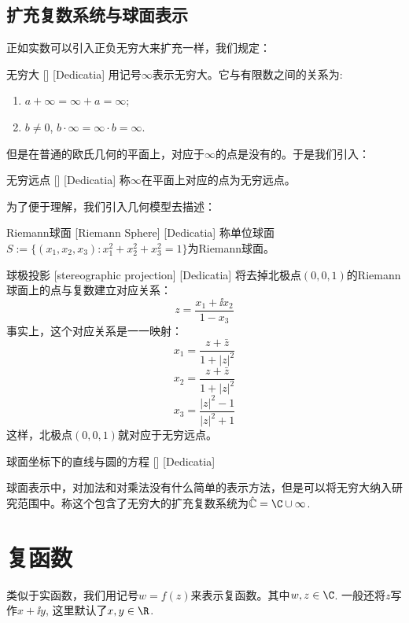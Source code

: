 \documentclass[UTF8]{ctexart}
\begin{document}
\subsection{扩充复数系统与球面表示}
正如实数可以引入正负无穷大来扩充一样，我们规定：
\begin{dfn}
    [UUID]
    {无穷大}
    []
    [Dedicatia]
    用记号$\infty$表示无穷大。它与有限数之间的关系为:
    \begin{enumerate}
        \item $a+\infty=\infty+a=\infty$;
        \item $b\neq 0$, $b\cdot\infty=\infty\cdot b=\infty$.
    \end{enumerate}
\end{dfn}
但是在普通的欧氏几何的平面上，对应于$\infty$的点是没有的。于是我们引入：
\begin{dfn}
    [UUID]
    {无穷远点}
    []
    [Dedicatia]
    称$\infty$在平面上对应的点为无穷远点。
\end{dfn}
为了便于理解，我们引入几何模型去描述：
\begin{dfn}
    [UUID]
    {Riemann球面}
    [Riemann Sphere]
    [Dedicatia]
    称单位球面$S:=\{(x_1,x_2,x_3):x_1^2+x_2^2+x_3^2=1\}$为Riemann球面。
\end{dfn}
\begin{ppt}
    [UUID]
    {球极投影}
    [stereographic projection]
    [Dedicatia]
    将去掉北极点$(0,0,1)$的Riemann球面上的点与复数建立对应关系：
    \[z=\frac{x_1+\ii x_2}{1-x_3}\]
    事实上，这个对应关系是一一映射：
    \[x_1=\frac{z+\bar{z}}{1+|z|^2}\]
    \[x_2=\frac{z+\bar{z}}{1+|z|^2}\]
    \[x_3=\frac{|z|^2-1}{|z|^2+1}\]
    这样，北极点$(0,0,1)$就对应于无穷远点。
\end{ppt}
\begin{ppt}
    [UUID]
    {球面坐标下的直线与圆的方程}
    []
    [Dedicatia]
\end{ppt}
球面表示中，对加法和对乘法没有什么简单的表示方法，但是可以将无穷大纳入研究范围中。称这个包含了无穷大的扩充复数系统为$\hat{\mathbb{C}}=\C\cup\infty $.
\section{复函数}
类似于实函数，我们用记号$w=f(z)$来表示复函数。其中$w,z\in\C$. 一般还将$z$写作$x+\ii y$, 这里默认了$x,y\in\R$. 
\end{document}
